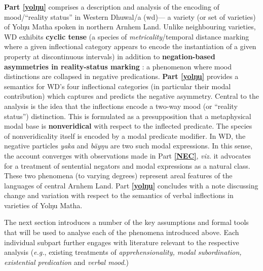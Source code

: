 \documentclass[12pt,dvipsnames]{report}
\begin{document}
 
\textbf{Part \ref{yolŋu}} comprises a description and analysis of the encoding of mood/``reality status'' in Western Dhuwal/a (\gls{wd})--- a variety (or set of varieties) of Yolŋu Matha spoken in northern Arnhem Land. Unlike neighbouring varieties, WD exhibits \textbf{cyclic tense} (a species of \textit{metricality}/temporal distance marking where a given inflectional category appears to encode the instantiation of a given property at discontinuous intervals) in addition to \textbf{negation-based asymmetries in reality-status marking} \citep[\textit{cf.}][]{Miestamo2005}: a phenomenon where mood distinctions are collapsed in negative predications. \textbf{Part \ref{yolŋu}} provides a semantics for WD's four inflectional categories (in particular their modal contribution) which captures and predicts the negative asymmetry. Central to the analysis is the idea that the inflections encode a two-way mood (or ``reality status'') distinction. This is formulated as a presupposition that a metaphysical modal base is \textbf{nonveridical} with respect to the inflected predicate. The species of nonveridicality itself is encoded by a modal predicate modifier. In WD, the negative particles \textit{yaka} and \textit{bäyŋu} are two such modal expressions. In this sense, the account converges with observations made in Part \textbf{\ref{NEC}}, \textit{viz.} it advocates for a treatment of sentential negators and modal expressions as a natural class. These two phenomena (to varying degrees) represent areal features of the languages of central Arnhem Land. Part \textbf{\ref{yolŋu}} concludes with a note discussing change and variation with respect to the semantics of verbal inflections in varieties of Yolŋu Matha.


The next section introduces a number of the key assumptions and formal tools that will be used to analyse each of the phenomena introduced above. Each individual subpart further engages with literature relevant to the respective analysis (\textit{e.g.}, existing treatments of \textit{apprehensionality, modal subordination, existential predication} and \textit{verbal mood}.)
\end{document}
